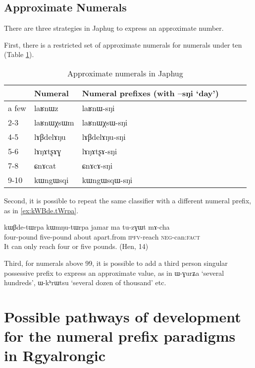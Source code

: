 \documentclass[oldfontcommands,oneside,a4paper,12pt]{article}
\newcommand{\ipa}[1]{{\phon#1}}
\begin{document}
 \subsection{Approximate Numerals}
There are three strategies in Japhug to express an approximate number.

First, there is a restricted set of approximate numerals for numerals under ten (Table \ref{tab:approx.num}).

\begin{table}[H]
\caption{Approximate numerals in Japhug} \label{tab:approx.num} \centering
\begin{tabular}{llllll}
\toprule
&Numeral &Numeral prefixes (with \ipa{--sŋi} `day')\\
\midrule
a few &\ipa{laʁnɯz}  & 	\ipa{laʁnɯ-sŋi}  & 	\\	
2-3&\ipa{laʁnɯχsɯm}  & 	\ipa{laʁnɯχsɯ-sŋi}  & 	\\	
4-5&\ipa{lɤβdelɤŋu}  & 	\ipa{lɤβdelɤŋu-sŋi}  & 	\\	
5-6&\ipa{lɤŋɤtʂɤɣ}  & 	\ipa{lɤŋɤtʂɤ-sŋi}  & 	\\	
7-8&\ipa{ɕnɤcat}  & 	\ipa{ɕnɤcɤ-sŋi }  & 	\\	
9-10&\ipa{kɯngɯsqi}  & 	\ipa{kɯngɯsqɯ-sŋi}  & 	\\	
\bottomrule
\end{tabular}
\end{table}

Second, it is possible to repeat the same classifier with a different numeral prefix, as in \ref{ex:kWBde.tWrpa}.
 
 
 \begin{exe}
\ex \label{ex:kWBde.tWrpa}
\gll 
\ipa{kɯβde-tɯrpa} 	\ipa{kɯmŋu-tɯrpa} 	\ipa{jamar} 	\ipa{ma} 	\ipa{tu-zɣɯt} 	\ipa{mɤ-cha} \\
four-pound five-pound about apart.from \textsc{ipfv}-reach \textsc{neg}-can:\textsc{fact} \\
\glt It can only reach four or five pounds. (Hen, 14)
\end{exe}


Third, for numerals above 99, it is possible to add a third person singular possessive prefix to  express an approximate value, as in  \ipa{ɯ-ɣurʑa} `several hundreds', \ipa{ɯ-kʰrɯtsu} `several dozen of thousand' etc.


\section{Possible pathways of development for the numeral prefix paradigms  in Rgyalrongic }
\end{document}
